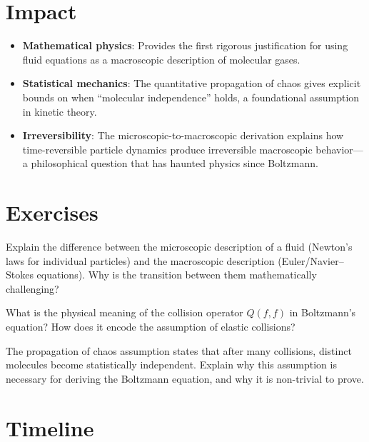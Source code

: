 \section{Impact}
\begin{itemize}
\item \textbf{Mathematical physics}: Provides the first rigorous justification for using fluid equations as a macroscopic description of molecular gases.
\item \textbf{Statistical mechanics}: The quantitative propagation of chaos gives explicit bounds on when ``molecular independence'' holds, a foundational assumption in kinetic theory.
\item \textbf{Irreversibility}: The microscopic-to-macroscopic derivation explains how time-reversible particle dynamics produce irreversible macroscopic behavior---a philosophical question that has haunted physics since Boltzmann.
\end{itemize}

\section{Exercises}

\begin{exercise}[Basic]
Explain the difference between the microscopic description of a fluid (Newton's laws for individual particles) and the macroscopic description (Euler/Navier--Stokes equations). Why is the transition between them mathematically challenging?
\end{exercise}

\begin{exercise}[Intermediate]
What is the physical meaning of the collision operator $Q(f,f)$ in Boltzmann's equation? How does it encode the assumption of elastic collisions?
\end{exercise}

\begin{exercise}[Challenge]
The propagation of chaos assumption states that after many collisions, distinct molecules become statistically independent. Explain why this assumption is necessary for deriving the Boltzmann equation, and why it is non-trivial to prove.
\end{exercise}

\section{Timeline}

